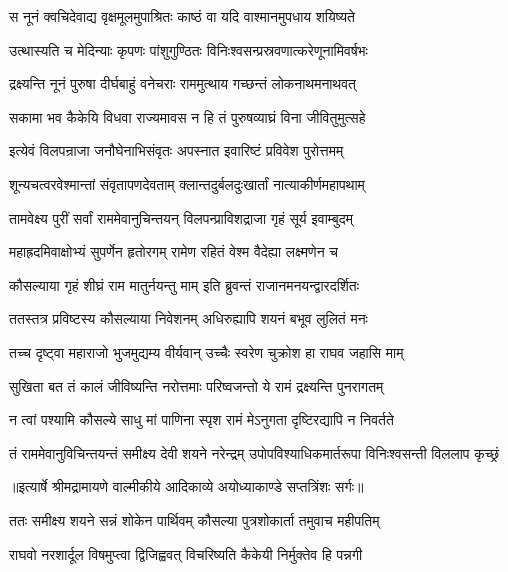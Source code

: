 \twolineshloka
{स नूनं क्वचिदेवाद्य वृक्षमूलमुपाश्रितः}
{काष्ठं वा यदि वाश्मानमुपधाय शयिष्यते} %

\twolineshloka
{उत्थास्यति च मेदिन्याः कृपणः पांशुगुण्ठितः}
{विनिःश्वसन्प्रस्रवणात्करेणूनामिवर्षभः} %

\twolineshloka
{द्रक्ष्यन्ति नूनं पुरुषा दीर्घबाहुं वनेचराः}
{राममुत्थाय गच्छन्तं लोकनाथमनाथवत्} %

\twolineshloka
{सकामा भव कैकेयि विधवा राज्यमावस}
{न हि तं पुरुषव्याघ्रं विना जीवितुमुत्सहे} %

\twolineshloka
{इत्येवं विलपन्राजा जनौघेनाभिसंवृतः}
{अपस्नात इवारिष्टं प्रविवेश पुरोत्तमम्} %

\twolineshloka
{शून्यचत्वरवेश्मान्तां संवृतापणदेवताम्}
{क्लान्तदुर्बलदुःखार्तां नात्याकीर्णमहापथाम्} %

\twolineshloka
{तामवेक्ष्य पुरीं सर्वां राममेवानुचिन्तयन्}
{विलपन्प्राविशद्राजा गृहं सूर्य इवाम्बुदम्} %

\twolineshloka
{महाह्रदमिवाक्षोभ्यं सुपर्णेन हृतोरगम्}
{रामेण रहितं वेश्म वैदेह्या लक्ष्मणेन च} %

\twolineshloka
{कौसल्याया गृहं शीघ्रं राम मातुर्नयन्तु माम्}
{इति ब्रुवन्तं राजानमनयन्द्वारदर्शितः} %

\twolineshloka
{ततस्तत्र प्रविष्टस्य कौसल्याया निवेशनम्}
{अधिरुह्यापि शयनं बभूव लुलितं मनः} %

\twolineshloka
{तच्च दृष्ट्वा महाराजो भुजमुद्यम्य वीर्यवान्}
{उच्चैः स्वरेण चुक्रोश हा राघव जहासि माम्} %

\twolineshloka
{सुखिता बत तं कालं जीविष्यन्ति नरोत्तमाः}
{परिष्वजन्तो ये रामं द्रक्ष्यन्ति पुनरागतम्} %

\twolineshloka
{न त्वां पश्यामि कौसल्ये साधु मां पाणिना स्पृश}
{रामं मेऽनुगता दृष्टिरद्यापि न निवर्तते} %

\fourlineindentedshloka
{तं राममेवानुविचिन्तयन्तं}
{ समीक्ष्य देवी शयने नरेन्द्रम्}
{उपोपविश्याधिकमार्तरूपा}
{ विनिःश्वसन्ती विललाप कृच्छ्रं} %


{॥इत्यार्षे श्रीमद्रामायणे वाल्मीकीये आदिकाव्ये अयोध्याकाण्डे सप्तत्रिंशः सर्गः॥}


\twolineshloka
{ततः समीक्ष्य शयने सन्नं शोकेन पार्थिवम्}
{कौसल्या पुत्रशोकार्ता तमुवाच महीपतिम्} %

\twolineshloka
{राघवो नरशार्दूल विषमुप्त्वा द्विजिह्ववत्}
{विचरिष्यति कैकेयी निर्मुक्तेव हि पन्नगी} %

